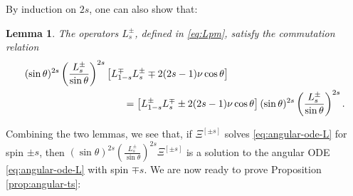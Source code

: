 \documentclass[11pt]{article}
\newtheorem{lemma}[proposition]{Lemma}
\numberwithin{equation}{section}
\begin{document}
By induction on $2s$, one can also show that:

\begin{lemma}\label{lem:angular-commutation}
The operators $L^{\pm}_s$, defined in \eqref{eq:Lpm}, satisfy the commutation relation
\begin{align}\label{eq:angular-commutation}
&(\sin\theta)^{2s}\left(\frac{L^{\pm}_s}{\sin\theta}\right)^{2s}
\left[ L^{\mp}_{1-s}L^{\pm}_s\mp2(2s-1)\nu\cos\theta\right]
\notag\\
&\hspace{35mm}=
\left[L^{\pm}_{1-s}L^{\mp}_s\pm2(2s-1)\nu\cos\theta\right]
(\sin\theta)^{2s}\left(\frac{L^{\pm}_s}{\sin\theta}\right)^{2s}.
\end{align}
\end{lemma}

Combining the two lemmas, we see that, if  $\Xi^{[\pm s]}$ solves \eqref{eq:angular-ode-L} for spin $\pm s$, then $(\sin\theta)^{2s}\left(\frac{L^{\pm}_s}{\sin\theta}\right)^{2s}\Xi^{[\pm s]}$ is a solution to the angular ODE \eqref{eq:angular-ode-L} with spin $\mp s$. We are now ready to prove Proposition \ref{prop:angular-ts}:
\end{document}
